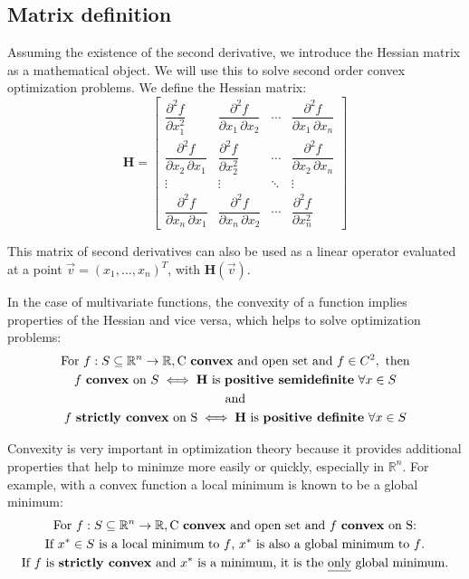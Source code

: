 \documentclass[../convex_optimization.tex]{subfiles}
\begin{document}
\subsection{Matrix definition}
Assuming the existence of the second derivative, we introduce
the Hessian matrix as a mathematical object. We will use this
to solve second order convex optimization problems.
We define the Hessian matrix:
\begin{equation}
    \mathbf H = \begin{bmatrix}
        \dfrac{\partial^2 f}{\partial x_1^2} &
        \dfrac{\partial^2 f}{\partial x_1\,\partial x_2} &
        \cdots & \dfrac{\partial^2 f}{\partial x_1\,\partial x_n} \\[2.2ex]
        \dfrac{\partial^2 f}{\partial x_2\,\partial x_1} &
        \dfrac{\partial^2 f}{\partial x_2^2} & \cdots &
        \dfrac{\partial^2 f}{\partial x_2\,\partial x_n} \\[2.2ex]
        \vdots & \vdots & \ddots & \vdots \\[2.2ex]
        \dfrac{\partial^2 f}{\partial x_n\,\partial x_1} &
        \dfrac{\partial^2 f}{\partial x_n\,\partial x_2} &
        \cdots & \dfrac{\partial^2 f}{\partial x_n^2}
    \end{bmatrix}
    \label{hessian_definition}
\end{equation}

This matrix of second derivatives can also be used as a linear
operator evaluated at a point $\vec{v}=(x_1, \ldots, x_n)^T$,
with $\mathbf H(\vec{v})$.

In the case of multivariate functions, the convexity of a function
implies properties of the Hessian and vice versa, which
helps to solve optimization problems:
\begin{gather}
    \text{For } f: S \subseteq \mathbb R^n \to \mathbb R,
    \text{C \textbf{convex} and open set and } f \in C^2,
    \text{ then}\nonumber\\
    f \text{ \textbf{convex} on }S \iff
    \mathbf H \text{ is \textbf{positive semidefinite} } \forall x \in S\label{hessian_convex}\\
    \text{and}\nonumber\\
    f \text{ \textbf{strictly convex} on S} \iff
    \mathbf H \text{ is \textbf{positive definite} } \forall x \in S
\end{gather}

Convexity is very important in optimization theory because it provides
additional properties that help to minimze more easily or quickly,
especially in $\mathbb R^n$. For example, with a convex function
a local minimum is known to be a global minimum:
\begin{gather}
    \text{For } f: S \subseteq \mathbb R^n \to \mathbb R,
    \text{C \textbf{convex} and open set and $f$ \textbf{convex} on S:}
    \nonumber\\
    \text{If } x^* \in S \text{ is a local minimum to $f$, } 
    x^* \text{ is also a global minimum to $f$.}\\
    \text{If $f$ is \textbf{strictly convex} and $x^*$ is a minimum,
    it is the \underline{only} global minimum.}
\end{gather}
\end{document}
